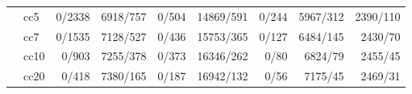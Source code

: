 \begin{table}[htbp]
\begin{tabular}{llrrrrrrr}
		& cc5
		& 0/2338 & 6918/757 & 0/504
		& 14869/591 & 0/244 & 5967/312
		& 2390/110 \\

		& cc7
		& 0/1535 & 7128/527 & 0/436
		& 15753/365 & 0/127 & 6484/145
		& 2430/70 \\

		& cc10
		& 0/903 & 7255/378 & 0/373
		& 16346/262 & 0/80 & 6824/79
		& 2455/45 \\

		& cc20
		& 0/418 & 7380/165 & 0/187
		& 16942/132 & 0/56 & 7175/45
		& 2469/31 \\

		\bottomrule
	\end{tabular}
	\vspace{0.3em}
\end{table}